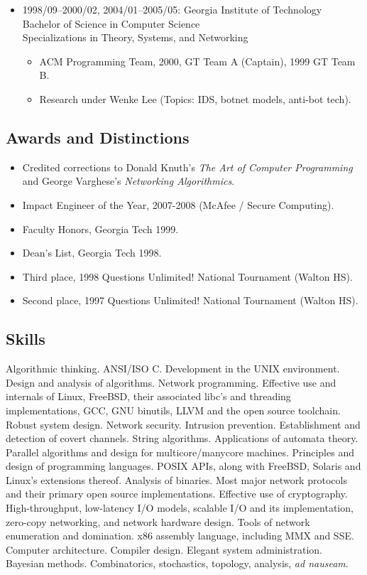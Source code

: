 \documentclass{article}
\newenvironment{tightitemize}
{\begin{itemize}
  \setlength{\itemsep}{1pt}
  \setlength{\parskip}{0pt}
  \setlength{\parsep}{0pt}}
{\end{itemize}}
\begin{document}
\begin{tightitemize}
\item 1998/09--2000/02, 2004/01--2005/05: Georgia Institute of Technology\\
Bachelor of Science in Computer Science\\
Specializations in Theory, Systems, and Networking
\begin{tightitemize}
\item ACM Programming Team, 2000, GT Team A (Captain), 1999 GT Team B.
\item Research under Wenke Lee (Topics: IDS, botnet models, anti-bot tech).
\end{tightitemize}

\end{tightitemize}

\subsection*{Awards and Distinctions}
\begin{tightitemize}
\item Credited corrections to Donald Knuth's \textit{The Art of Computer Programming}
   and George Varghese's \textit{Networking Algorithmics}.
\item Impact Engineer of the Year, 2007-2008 (McAfee / Secure Computing).
\item Faculty Honors, Georgia Tech 1999.
\item Dean's List, Georgia Tech 1998.
\item Third place, 1998 Questions Unlimited! National Tournament (Walton HS).
\item Second place, 1997 Questions Unlimited! National Tournament (Walton HS).
\end{tightitemize}

\subsection*{Skills}
Algorithmic thinking. ANSI/ISO C. Development in the UNIX environment. Design
and analysis of algorithms. Network programming. Effective use and internals
of Linux, FreeBSD, their associated libc's and threading implementations,
GCC, GNU binutils, LLVM and the open source toolchain. Robust system design.
Network security. Intrusion prevention. Establishment and detection of covert
channels. String algorithms. Applications of automata theory. Parallel
algorithms and design for multicore/manycore machines. Principles and design
of programming languages. POSIX APIs, along with FreeBSD, Solaris and Linux's
extensions thereof. Analysis of binaries. Most major network protocols and
their primary open source implementations. Effective use of cryptography.
High-throughput, low-latency I/O models, scalable I/O and its implementation,
zero-copy networking, and network hardware design. Tools of network
enumeration and domination. x86 assembly language, including MMX and SSE.
Computer architecture. Compiler design. Elegant system administration.
Bayesian methods. Combinatorics, stochastics, topology, analysis, \textit{ad nauseam}.
\end{document}
